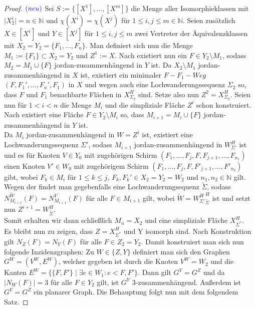 \documentclass[12pt,titlepage]{article}
\begin{document}
\begin{proof}$\textcolor{blue}{(neu)}$
Sei $S:=\{[X^1],\ldots,[X^m]\}$ die Menge aller Isomorphieklassen mit $\vert X^i_2 \vert =n \in \mathbb{N}$ und $\chi(X^i)=\chi(X^j)$ für 
$1 \leq i,j \leq m \in \mathbb{N}$. Seien zusätzlich $X \in [X^i]$ und $Y \in [X^j]$ für $1 \leq i,j \leq m$ zwei Vertreter der Äquivalenzklassen mit $X_2=Y_2=\{F_1,\ldots,F_n\}$.
 Man definiert sich nun die Menge $M_1:=\{F_1\} \subset X_2=Y_2$ und $Z^1:=X$. Nach  existiert nun ein $F \in Y_2\setminus M_1$, sodass $M_2=M_1 \cup \{F\}$ jordan-zusammenhängend in $Y$ ist. Da $X_2 \setminus M_1$ jordan-zusammenhängend in $X$ ist, existiert ein minimaler $F-F_1-Weg$ $(F,F_1',\ldots,F_n',F_1)$ in $X$ und wegen  auch eine Lochwanderungssequenz $\Sigma_2$ so, dass $F$ und $F_1$ benachbarte Flächen in $X^H_{\Sigma_2} $ sind. Setze also nun $Z^2=X^H_{\Sigma_2}$. Seien nun für $1 < i < n$ die Menge $M_i$ und die simpliziale Fläche $Z^i$ schon konstruiert. Nach   existiert eine Fläche $F \in Y_2 \setminus M_i$ so, dass $M_{i+1}=M_i \cup \{F\}$ jordan-zusammenhängend in $Y$ ist. \\
  Da $M_i$ jordan-zusammenhängend in $W={Z^i}$ ist, existiert eine Lochwanderungssequenz $\Sigma'$, sodass $M_{i+1}$ jordan-zusammenhängend in $W^H_{\Sigma'}$ ist und es für Knoten $V\in Y_0$ mit zugehörigen Schirm $(F_1,\ldots,F_j,F,F_{j+1},\ldots,F_{n_1})$ einen Knoten $V'\in W_0$ mit zugehörigem Schirm $(F_1,\ldots,F_j,F,F'_{j+1},\ldots,F'_{n_2})$ gibt, wobei $F_k \in M_i$ für $1\leq k\leq j$, $F_k,F_k'\in X_2=Y_2=W_2$ und $n_1,n_2 \in \mathbb{N}$ gilt. Wegen der  findet man gegebenfalls eine Lochwanderungsequenz $\tilde{\Sigma}$, sodass $N_{M_{i+1}}^{\tilde{W}}(F)=N_{M_{i+1}}^Y(F)$ für alle $F \in M_{i+1}$ gilt, wobei $\tilde{W}={W_{\Sigma'}^H}^H_{\tilde{\Sigma}}$ ist  und setzt nun $Z^{i+1}=W^H_{\tilde{\Sigma}}$.\\
Somit erhalten wir dann schließlich $M_n=X_2$ und eine simpliziale Fläche $X^H_{\Sigma^*}$.\\ Es bleibt nun zu zeigen, dass $Z=X^H_{\Sigma^*}$ und Y isomorph sind. Nach Konstruktion gilt $N_Z(F)=N_Y(F)$ für alle $F\in Z_2=Y_2$. Damit konstruiert man sich nun folgende Inzidenzgraphen: 
Zu $W\in \{Z,Y\}$ definiert man sich den Graphen  $G^W=(V^W,E^W)$, welcher gegeben ist durch die Knoten $V^W=W_2$ und die Kanten $E^W=\{\{F,F'\} \mid \exists e \in W_1 : e<F,F' \}$. 
Dann gilt $G^Y=G^Z$ und da $\vert N_W(F) \vert =3$ für alle $F\in Y_2$ gilt,  ist $G^Y$ 3-zusammenhängend. Außerdem ist $G^Y=G^Z$ ein planarer Graph. Die Behauptung folgt nun mit dem folgendem Satz.

\end{proof}
\end{document}

